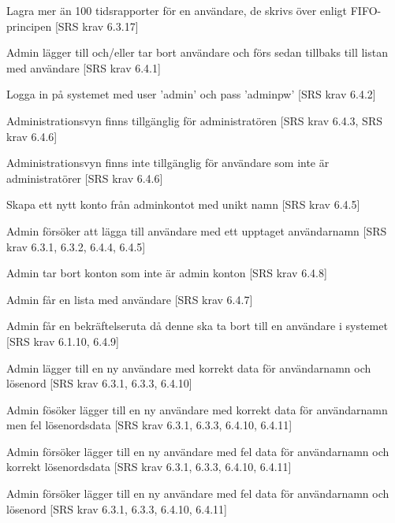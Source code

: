 \documentclass[a4paper]{article}
\begin{document}
\begin{appendices}
\begin{FT}
\item
Lagra mer än 100 tidsrapporter för en användare, de skrivs över enligt FIFO-principen [SRS krav 6.3.17]

\item
Admin lägger till och/eller tar bort användare och förs sedan tillbaks till listan med användare [SRS krav 6.4.1]

\item
Logga in på systemet med user 'admin' och pass 'adminpw' [SRS krav 6.4.2]

\item 
Administrationsvyn finns tillgänglig för administratören [SRS krav 6.4.3, SRS krav 6.4.6]

\item
Administrationsvyn finns inte tillgänglig för användare som inte är administratörer [SRS krav 6.4.6]

\item
Skapa ett nytt konto från adminkontot med unikt namn [SRS krav 6.4.5]

\item
Admin försöker att lägga till användare med ett upptaget användarnamn [SRS krav 6.3.1, 6.3.2, 6.4.4, 6.4.5]

\item
Admin tar bort konton som inte är admin konton [SRS krav 6.4.8]

\item
Admin får en lista med användare [SRS krav 6.4.7]

\item
Admin får en bekräftelseruta då denne ska ta bort till en användare i systemet [SRS krav 6.1.10, 6.4.9]

\item
Admin lägger till en ny användare med korrekt data för användarnamn och lösenord [SRS krav 6.3.1, 6.3.3, 6.4.10]

\item
Admin fösöker lägger till en ny användare med korrekt data för användarnamn men fel lösenordsdata [SRS krav 6.3.1, 6.3.3, 6.4.10, 6.4.11]

\item
Admin försöker lägger till en ny användare med fel data för användarnamn och korrekt lösenordsdata [SRS krav 6.3.1, 6.3.3, 6.4.10, 6.4.11]

\item
Admin försöker lägger till en ny användare med fel data för användarnamn och lösenord [SRS krav 6.3.1, 6.3.3, 6.4.10, 6.4.11]


\end{FT}
\end{appendices}
\end{document}
